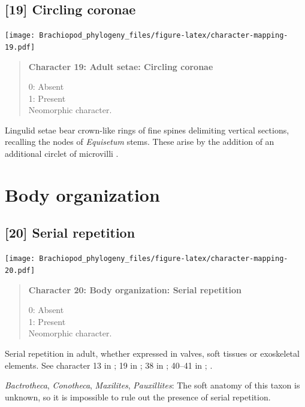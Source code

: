 \documentclass[openany]{book}
\begin{document}
\subsection*{{[}19{]} Circling coronae}\label{circling-coronae}

\texttt{[image: Brachiopod\_phylogeny\_files/figure-latex/character-mapping-19.pdf]}

\begin{quote}
\textbf{Character 19: Adult setae: Circling coronae}

0: Absent\\
1: Present\\
Neomorphic character.
\end{quote}

Lingulid setae bear crown-like rings of fine spines delimiting vertical
sections, recalling the nodes of \emph{Equisetum} stems. These arise by
the addition of an additional circlet of microvilli \citep[see][fig.
1e]{Luter2000}.

\section{Body organization}\label{body-organization}

\subsection*{{[}20{]} Serial repetition}\label{serial-repetition}

\texttt{[image: Brachiopod\_phylogeny\_files/figure-latex/character-mapping-20.pdf]}

\begin{quote}
\textbf{Character 20: Body organization: Serial repetition}

0: Absent\\
1: Present\\
Neomorphic character.
\end{quote}

Serial repetition in adult, whether expressed in valves, soft tissues or
exoskeletal elements. See character 13 in \citet{Rouse1999}; 19 in
\citet{Vinther2008}; 38 in \citet{Haszprunar1996}; 40--41 in
\citet{Sutton2012}; \citet{Wanninger2009}.

\hypertarget{Bactrotheca-coding-20}{}
\emph{Bactrotheca}, \emph{Conotheca}, \emph{Maxilites},
\emph{Pauxillites}: The soft anatomy of this taxon is unknown, so it is
impossible to rule out the presence of serial repetition.
\end{document}
